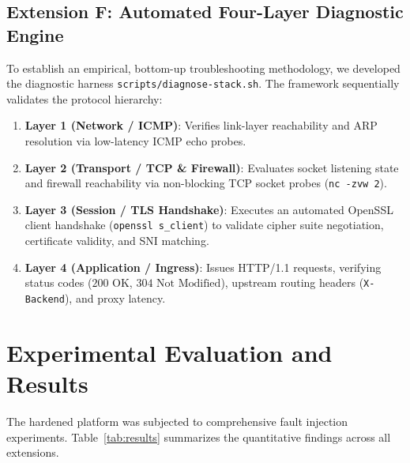 \documentclass[conference]{IEEEtran}
\begin{document}
\subsection{Extension F: Automated Four-Layer Diagnostic Engine}
To establish an empirical, bottom-up troubleshooting methodology, we developed the diagnostic harness \texttt{scripts/diagnose-stack.sh}. The framework sequentially validates the protocol hierarchy:
\begin{enumerate}
    \item \textbf{Layer 1 (Network / ICMP)}: Verifies link-layer reachability and ARP resolution via low-latency ICMP echo probes.
    \item \textbf{Layer 2 (Transport / TCP \& Firewall)}: Evaluates socket listening state and firewall reachability via non-blocking TCP socket probes (\texttt{nc -zvw 2}).
    \item \textbf{Layer 3 (Session / TLS Handshake)}: Executes an automated OpenSSL client handshake (\texttt{openssl s\_client}) to validate cipher suite negotiation, certificate validity, and SNI matching.
    \item \textbf{Layer 4 (Application / Ingress)}: Issues HTTP/1.1 requests, verifying status codes ($200\text{ OK}$, $304\text{ Not Modified}$), upstream routing headers (\texttt{X-Backend}), and proxy latency.
\end{enumerate}

\section{Experimental Evaluation and Results}
The hardened platform was subjected to comprehensive fault injection experiments. Table~\ref{tab:results} summarizes the quantitative findings across all extensions.
\end{document}
